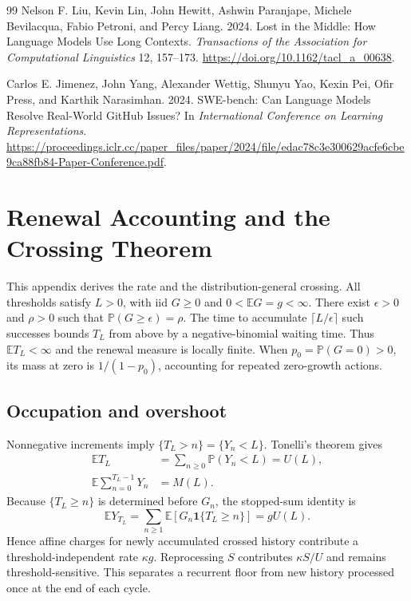 \documentclass[sigconf,screen,nonacm]{acmart}
\newcommand{\E}{\mathbb{E}}
\newcommand{\Prob}{\mathbb{P}}
\newcommand{\ind}{\mathbf{1}}
\begin{document}
\begin{thebibliography}{99}
Nelson F. Liu, Kevin Lin, John Hewitt, Ashwin Paranjape, Michele Bevilacqua,
Fabio Petroni, and Percy Liang. 2024. Lost in the Middle: How Language
Models Use Long Contexts. \emph{Transactions of the Association for
Computational Linguistics} 12, 157--173.
\url{https://doi.org/10.1162/tacl_a_00638}.

Carlos E. Jimenez, John Yang, Alexander Wettig, Shunyu Yao, Kexin Pei,
Ofir Press, and Karthik Narasimhan. 2024. SWE-bench: Can Language Models
Resolve Real-World GitHub Issues? In \emph{International Conference on
Learning Representations}.
\url{https://proceedings.iclr.cc/paper_files/paper/2024/file/edac78c3e300629acfe6cbe9ca88fb84-Paper-Conference.pdf}.
\end{thebibliography}

\appendix
\section{Renewal Accounting and the Crossing Theorem}
\label{app:renewal}

This appendix derives the rate and the distribution-general crossing. All
thresholds satisfy $L>0$, with iid $G\ge0$ and $0<\E G=g<\infty$.
There exist $\epsilon>0$ and $\rho>0$ such that $\Prob(G\ge\epsilon)=\rho$.
The time to accumulate $\lceil L/\epsilon\rceil$ such successes bounds $T_L$
from above by a negative-binomial waiting time. Thus $\E T_L<\infty$ and
the renewal measure is locally finite. When $p_0=\Prob(G=0)>0$, its mass at
zero is $1/(1-p_0)$, accounting for repeated zero-growth actions.

\subsection{Occupation and overshoot}
Nonnegative increments imply $\{T_L>n\}=\{Y_n<L\}$. Tonelli's theorem gives
\begin{align}
\E T_L&=\sum_{n\ge0}\Prob(Y_n<L)=U(L),\\
\E\sum_{n=0}^{T_L-1}Y_n&=M(L).
\end{align}
Because $\{T_L\ge n\}$ is determined before $G_n$, the stopped-sum identity is
\begin{equation}
\E Y_{T_L}=\sum_{n\ge1}\E[G_n\ind\{T_L\ge n\}]=gU(L).
\end{equation}
Hence affine charges for newly accumulated crossed history contribute a
threshold-independent rate $\kappa g$. Reprocessing $S$ contributes
$\kappa S/U$ and remains threshold-sensitive. This separates a recurrent
floor from new history processed once at the end of each cycle.
\end{document}
